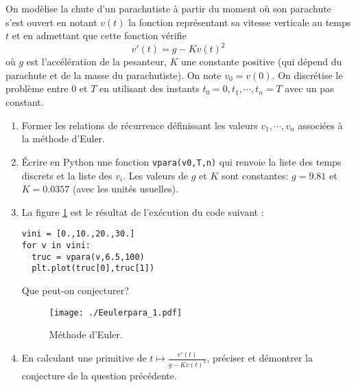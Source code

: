 On modèlise la chute d'un parachutiste à partir du moment où son parachute s'est ouvert en notant $v(t)$ la fonction représentant sa vitesse verticale au temps $t$ et en admettant que cette fonction vérifie
\begin{displaymath}
  v'(t) = g - K v(t)^2
\end{displaymath}
où $g$ est l'accélération de la pesanteur, $K$ une constante positive (qui dépend du parachute et de la masse du parachutiste). On note $v_0=v(0)$.\newline
On discrétise le problème entre $0$ et $T$ en utilisant des instants $t_0=0,t_1,\cdots,t_n=T$ avec un pas constant.

\begin{enumerate}
  \item Former les relations de récurrence définissant les valeurs $v_1,\cdots,v_n$ associées à la méthode d'Euler.
  \item \'Ecrire en Python une fonction \texttt{vpara(v0,T,n)} qui renvoie la liste des temps discrets et la liste des $v_i$. Les valeurs de $g$ et $K$ sont constantes: $g=9.81$ et $K= 0.0357$ (avec les unités usuelles).
  \item La figure \ref{fig:Eeulerpara_1} est le résultat de l'exécution du code suivant :
\begin{verbatim}
vini = [0.,10.,20.,30.]
for v in vini:    
  truc = vpara(v,6.5,100)
  plt.plot(truc[0],truc[1])  
\end{verbatim}
Que peut-on conjecturer?
\begin{figure}[h]
  \centering
  \texttt{[image: ./Eeulerpara\_1.pdf]}
  \caption{Méthode d'Euler.}
  \label{fig:Eeulerpara_1}
\end{figure}

  \item En calculant une primitive de $t\mapsto \frac{v'(t)}{g-Kv(t)^2}$, préciser et démontrer la conjecture de la question précédente.
\end{enumerate}

